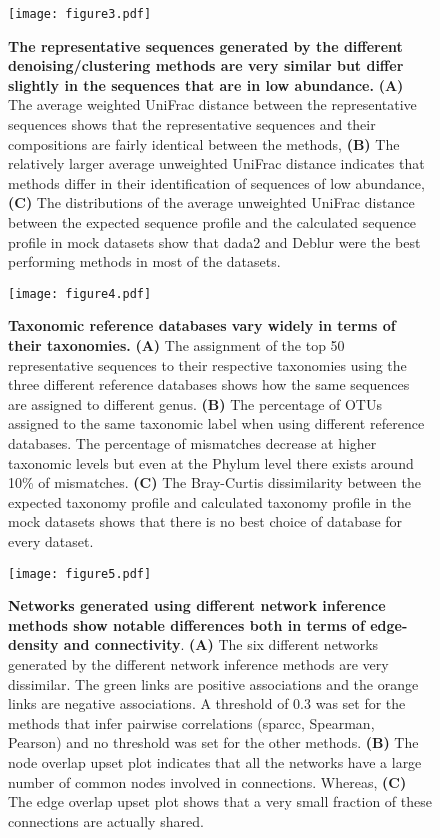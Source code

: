 \begin{figure}[h]
  \centering
  \texttt{[image: figure3.pdf]}
  \caption{
    \textbf{The representative sequences generated by the different denoising/clustering methods are very similar but differ slightly in the sequences that are in low abundance.}
    \textbf{(A)} The average weighted UniFrac distance between the representative sequences shows that the representative sequences and their compositions are fairly identical between the methods,
    \textbf{(B)} The relatively larger average unweighted UniFrac distance indicates that methods differ in their identification of sequences of low abundance,
    \textbf{(C)} The distributions of the average unweighted UniFrac distance between the expected sequence profile and the calculated sequence profile in mock datasets show that dada2 and Deblur were the best performing methods in most of the datasets.
  }
  \label{fig:figure3}
\end{figure}

\begin{figure}[h]
  \centering
  \texttt{[image: figure4.pdf]}
  \caption{
    \textbf{Taxonomic reference databases vary widely in terms of their taxonomies.}
    \textbf{(A)} The assignment of the top 50 representative sequences to their respective taxonomies using the three different reference databases shows how the same sequences are assigned to different genus.
    \textbf{(B)} The percentage of \ac{OTU}s assigned to the same taxonomic label when using different reference databases.
    The percentage of mismatches decrease at higher taxonomic levels but even at the Phylum level there exists around 10\% of mismatches.
    \textbf{(C)} The Bray-Curtis dissimilarity between the expected taxonomy profile and calculated taxonomy profile in the mock datasets shows that there is no best choice of database for every dataset.
  }
  \label{fig:figure4}
\end{figure}

\begin{figure}[h]
  \centering
  \texttt{[image: figure5.pdf]}
  \caption{
    \textbf{Networks generated using different network inference methods show notable differences both in terms of edge-density and connectivity}.
    \textbf{(A)} The six different networks generated by the different network inference methods are very dissimilar.
    The green links are positive associations and the orange links are negative associations.
    A threshold of 0.3 was set for the methods that infer pairwise correlations (\ac{sparcc}, Spearman, Pearson) and no threshold was set for the other methods.
    \textbf{(B)} The node overlap upset plot indicates that all the networks have a large number of common nodes involved in connections.
    Whereas, \textbf{(C)} The edge overlap upset plot shows that a very small fraction of these connections are actually shared.
  }
  \label{fig:figure5}
\end{figure}

